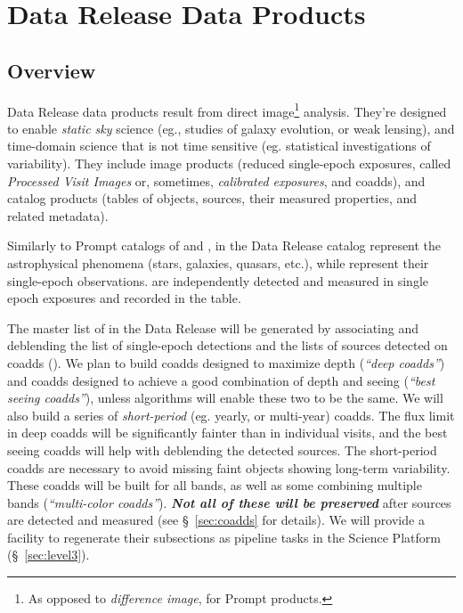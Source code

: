 \documentclass[SE,lsstdraft,toc]{lsstdoc}
\begin{document}
\clearpage

\section{Data Release Data Products}
\label{sec:level2}

\subsection{Overview}

Data Release data products result from direct image\footnote{As opposed to \emph{difference image}, for Prompt products.} analysis. They're designed to enable \emph{static sky} science (eg., studies of galaxy evolution, or weak lensing), and time-domain science that is not time sensitive (eg. statistical investigations of variability). They include image products (reduced single-epoch exposures, called \emph{Processed Visit Images} or, sometimes, \emph{calibrated exposures}, and coadds), and catalog products (tables of objects, sources, their measured properties, and related metadata).

Similarly to Prompt catalogs of \DIAObjects and \DIASources, \Objects in the Data Release catalog represent the astrophysical phenomena (stars, galaxies, quasars, etc.), while \Sources represent their single-epoch observations. \Sources are independently detected and measured in single epoch exposures and recorded in the \Source table.

The master list of \Objects in the Data Release will be generated by associating and deblending the list of single-epoch \DIASource detections and the lists of sources detected on coadds (\CoaddSources). We plan to build coadds designed to maximize depth (\emph{``deep coadds''}) and coadds designed to achieve a good combination of depth and seeing (\emph{``best seeing coadds''}), unless
algorithms will enable these two to be the same.
We will also build a series of \emph{short-period} (eg. yearly, or multi-year) coadds.
The flux limit in deep coadds will be significantly fainter than in individual visits, and the best seeing coadds will help with deblending the detected sources. The short-period coadds are necessary to avoid missing faint objects showing long-term variability. These coadds will be built for all bands, as well as some combining multiple bands (\emph{``multi-color coadds''}). \textbf{\emph{Not all of these will be preserved}} after sources are detected and measured (see \S~\ref{sec:coadds} for details). We will provide a facility to regenerate their subsections as pipeline tasks in the Science Platform (\S~\ref{sec:level3}).
\end{document}
